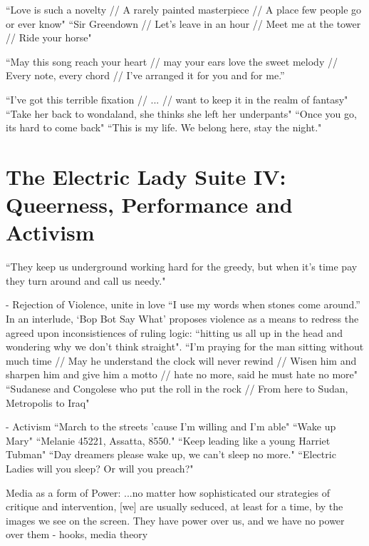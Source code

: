 \documentclass[a4paper, 11pt]{article} %
\begin{document}
``Love is such a novelty // A rarely painted masterpiece // A place few people go or ever know"\cite{sayyouwillgo}
``Sir Greendown // Let's leave in an hour // Meet me at the tower // Ride your horse"\cite{greendown}

``May this song reach your heart // may your ears love the sweet melody // Every note, every chord // I've arranged it for you and for me.''\cite{neonvalleystreet}

``I've got this terrible fixation // ... // want to keep it in the realm of fantasy"\cite{makethebus}
``Take her back to wondaland, she thinks she left her underpants"\cite{wondaland}
``Once you go, its hard to come back"\cite{wondaland}
``This is my life. We belong here, stay the night."\cite{wondaland}




\section*{The Electric Lady Suite IV: Queerness, Performance and Activism}

``They keep us underground working hard for the greedy, but when it's time pay they turn around and call us needy."\cite{queen}

- Rejection of Violence, unite in love
``I use my words when stones come around.''\cite{manymoons}
In an interlude, `Bop Bot Say What' proposes violence as a means to redress the agreed upon inconsistiences of ruling logic: ``hitting us all up in the head and wondering why we don't think straight"\cite{chromeshoppe}.
``I'm praying for the man sitting without much time // May he understand the clock will never rewind // Wisen him and sharpen him and give him a motto // hate no more, said he must hate no more"\cite{danceordie}
``Sudanese and Congolese who put the roll in the rock // From here to Sudan, Metropolis to Iraq"\cite{danceordie}

- Activism
``March to the streets 'cause I'm willing and I'm able"\cite{queen}
``Wake up Mary"\cite{sallyride}
``Melanie 45221, Assatta, 8550."\cite{chromeshoppe}
``Keep leading like a young Harriet Tubman"\cite{queen}
``Day dreamers please wake up, we can't sleep no more."\cite{sincerelyjane}
``Electric Ladies will you sleep? Or will you preach?"\cite{queen}

Media as a form of Power:
...no matter how sophisticated our strategies of critique and intervention, [we] are usually seduced, at least for a time, by the images we see on the screen. They have power over us, and we have no power over them - hooks, media theory
\end{document}
